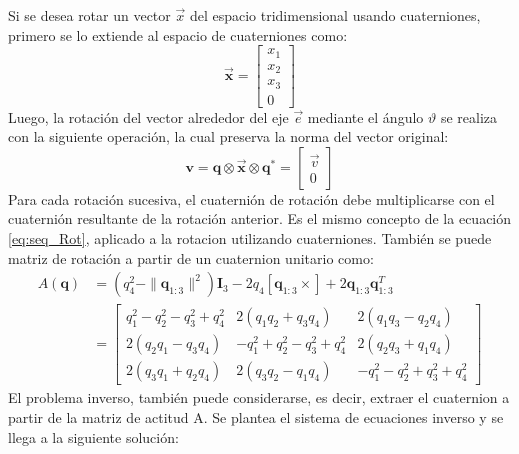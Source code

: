 Si se desea rotar un vector $\vec{x}$ del espacio tridimensional usando cuaterniones, primero se lo extiende al espacio de cuaterniones como:
\[
\vec{\mathbf{x}} = \begin{bmatrix}
	x_1 \\ x_2 \\ x_3 \\ 0
\end{bmatrix}
\]
Luego, la rotación del vector alrededor del eje $\vec{e}$ mediante el ángulo $\vartheta$ se realiza con la siguiente operación, la cual preserva la norma del vector original:
\begin{equation}
	\mathbf{v} = \mathbf{q} \otimes \vec{\mathbf{x}} \otimes \mathbf{q}^* = 
	\begin{bmatrix}
		\vec{v} \\
		0
	\end{bmatrix}
\end{equation}
 Para cada rotación sucesiva, el cuaternión de rotación debe multiplicarse con el cuaternión resultante de la rotación anterior. Es el mismo concepto de la ecuación  \ref{eq:seq_Rot}, aplicado a la rotacion utilizando cuaterniones. También se puede  matriz de rotación a partir de un cuaternion unitario como: 
\begin{align}
	A(\mathbf{q}) &= (q_4^2 - \|\mathbf{q}_{1:3}\|^2) \mathbf{I}_3 - 2q_4[\mathbf{q}_{1:3} \times] + 2 \mathbf{q}_{1:3} \mathbf{q}_{1:3}^T \nonumber \\
	&= 
	\left[
	\begin{array}{ccc}
		q_1^2 - q_2^2 - q_3^2 + q_4^2 & 2(q_1q_2 + q_3q_4) & 2(q_1q_3 - q_2q_4) \\
		2(q_2q_1 - q_3q_4) & -q_1^2 + q_2^2 - q_3^2 + q_4^2 & 2(q_2q_3 + q_1q_4) \\
		2(q_3q_1 + q_2q_4) & 2(q_3q_2 - q_1q_4) & -q_1^2 - q_2^2 + q_3^2 + q_4^2
	\end{array}
	\right]
\end{align}
El problema inverso, también puede considerarse, es decir, extraer el cuaternion a partir de la matriz de actitud A. Se plantea el sistema de ecuaciones inverso y se llega a la siguiente solución: 
